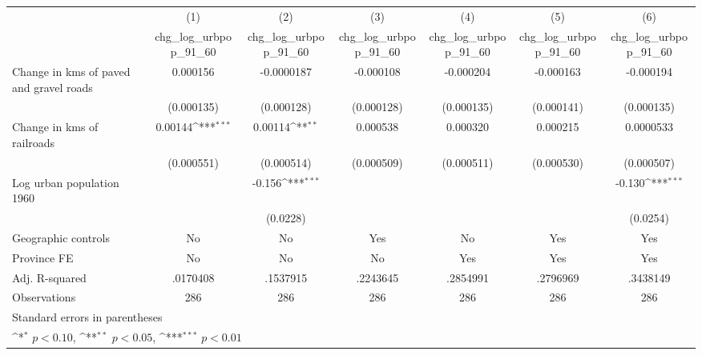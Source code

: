 {
\def\sym#1{\ifmmode^{#1}\else\(^{#1}\)\fi}
\begin{tabular}{l*{6}{c}}
\hline\hline
                    &\multicolumn{1}{c}{(1)}&\multicolumn{1}{c}{(2)}&\multicolumn{1}{c}{(3)}&\multicolumn{1}{c}{(4)}&\multicolumn{1}{c}{(5)}&\multicolumn{1}{c}{(6)}\\
                    &\multicolumn{1}{c}{chg\_log\_urbpop\_91\_60}&\multicolumn{1}{c}{chg\_log\_urbpop\_91\_60}&\multicolumn{1}{c}{chg\_log\_urbpop\_91\_60}&\multicolumn{1}{c}{chg\_log\_urbpop\_91\_60}&\multicolumn{1}{c}{chg\_log\_urbpop\_91\_60}&\multicolumn{1}{c}{chg\_log\_urbpop\_91\_60}\\
\hline
Change in kms of paved and gravel roads&    0.000156         &  -0.0000187         &   -0.000108         &   -0.000204         &   -0.000163         &   -0.000194         \\
                    &  (0.000135)         &  (0.000128)         &  (0.000128)         &  (0.000135)         &  (0.000141)         &  (0.000135)         \\
[1em]
Change in kms of railroads&     0.00144\sym{***}&     0.00114\sym{**} &    0.000538         &    0.000320         &    0.000215         &   0.0000533         \\
                    &  (0.000551)         &  (0.000514)         &  (0.000509)         &  (0.000511)         &  (0.000530)         &  (0.000507)         \\
[1em]
Log urban population 1960&                     &      -0.156\sym{***}&                     &                     &                     &      -0.130\sym{***}\\
                    &                     &    (0.0228)         &                     &                     &                     &    (0.0254)         \\
\hline
Geographic controls &          No         &          No         &         Yes         &          No         &         Yes         &         Yes         \\
Province FE         &          No         &          No         &          No         &         Yes         &         Yes         &         Yes         \\
Adj. R-squared      &    .0170408         &    .1537915         &    .2243645         &    .2854991         &    .2796969         &    .3438149         \\
Observations        &         286         &         286         &         286         &         286         &         286         &         286         \\
\hline\hline
\multicolumn{7}{l}{\footnotesize Standard errors in parentheses}\\
\multicolumn{7}{l}{\footnotesize \sym{*} \(p<0.10\), \sym{**} \(p<0.05\), \sym{***} \(p<0.01\)}\\
\end{tabular}
}
